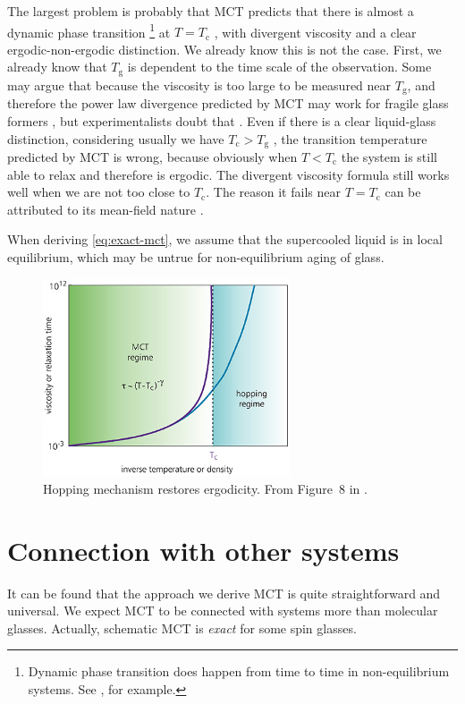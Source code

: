 \documentclass[hyperref, a4paper]{article}
\begin{document}
The largest problem is probably that MCT predicts that there is almost a dynamic phase transition%
\footnote{Dynamic phase transition does happen from time to time in non-equilibrium systems. 
See \cite{Heyl_2019}, for example.}
at $T = T_\text{c}$ \cite{2004-critical}, with divergent viscosity and a clear ergodic-non-ergodic distinction. 
We already know this is not the case. First, we already know that $T_\text{g}$ is dependent to the time scale 
of the observation. Some may argue that because the viscosity is too large to be measured near $T_\text{g}$,
and therefore the power law divergence predicted by MCT may work for fragile glass formers \cite{mct-primer},
but experimentalists doubt that \cite{Mauro_2009}. Even if there is a clear liquid-glass distinction,
considering usually we have $T_\text{c} > T_\text{g}$ \cite{mct2005}, the transition temperature predicted by MCT  
is wrong, because obviously when $T < T_\text{c}$ the system is still able to relax and therefore is ergodic.
The divergent viscosity formula still works well when we are not too close to $T_\text{c}$. The reason it 
fails near $T = T_\text{c}$ can be attributed to its mean-field nature \cite{mft-2004,mct-primer}. 

When deriving \eqref{eq:exact-mct}, we assume that the supercooled liquid is in local equilibrium, which may be 
untrue for non-equilibrium aging of glass.

\begin{figure}
    \centering
    \includegraphics[width=0.65\textwidth]{hopping-region.jpg}
    \caption{Hopping mechanism restores ergodicity. From Figure~8 in \cite{mct-primer}.}
\end{figure}

\section{Connection with other systems}

It can be found that the approach we derive MCT is quite straightforward and universal. We expect MCT to be 
connected with systems more than molecular glasses. Actually, schematic MCT is \emph{exact} for some spin 
glasses.


 
\end{document}
